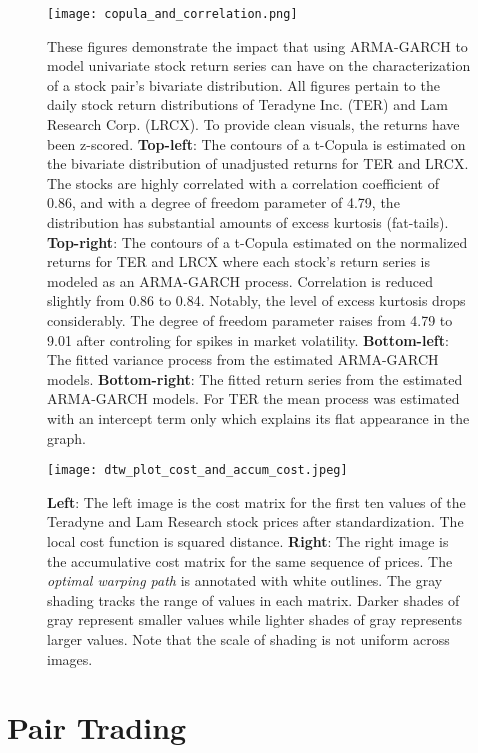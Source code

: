 \begin{figure}
    \centering
    \texttt{[image: copula\_and\_correlation.png]}
    \caption{These figures demonstrate the impact that using ARMA-GARCH to model univariate stock return series can have on the characterization of a stock pair's bivariate distribution. All figures pertain to the daily stock return distributions of Teradyne Inc. (TER) and Lam Research Corp. (LRCX). To provide clean visuals, the returns have been z-scored. \textbf{Top-left}: The contours of a t-Copula is estimated on the bivariate distribution of unadjusted returns for TER and LRCX. The stocks are highly correlated with a correlation coefficient of 0.86, and with a degree of freedom parameter of 4.79, the distribution has substantial amounts of excess kurtosis (fat-tails). \textbf{Top-right}: The contours of a t-Copula estimated on the normalized returns for TER and LRCX where each stock's return series is modeled as an ARMA-GARCH process. Correlation is reduced slightly from 0.86 to 0.84. Notably, the level of excess kurtosis drops considerably. The degree of freedom parameter raises from 4.79 to 9.01 after controling for spikes in market volatility. \textbf{Bottom-left}: The fitted variance process from the estimated ARMA-GARCH models. \textbf{Bottom-right}: The fitted return series from the estimated ARMA-GARCH models. For TER the mean process was estimated with an intercept term only which explains its flat appearance in the graph.}
    \label{fig:copula_and_correlation}
\end{figure}


\begin{figure}
    \centering
    \texttt{[image: dtw\_plot\_cost\_and\_accum\_cost.jpeg]}
    \caption{\textbf{Left}: The left image is the cost matrix for the first ten values of the Teradyne and Lam Research stock prices after standardization. The local cost function is squared distance. \textbf{Right}: The right image is the accumulative cost matrix for the same sequence of prices. The \textit{optimal warping path} is annotated with white outlines. The gray shading tracks the range of values in each matrix. Darker shades of gray represent smaller values while lighter shades of gray represents larger values. Note that the scale of shading is not uniform across images.}
    \label{fig:dtw_plot_cost_and_accum_cost}
\end{figure}


\section{Pair Trading} \label{sec:PairTrading}

